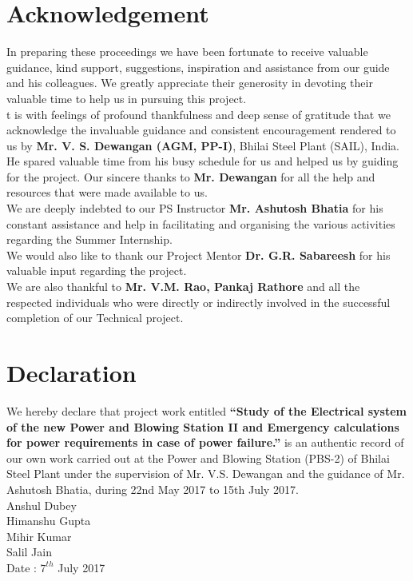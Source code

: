 \documentclass[english,11pt]{report}
\begin{document}
\chapter*{\centering Acknowledgement}
In preparing these proceedings we have been fortunate to receive valuable guidance, kind support, suggestions, inspiration and assistance from our guide and his colleagues. We greatly appreciate their generosity in devoting their valuable time to help us in pursuing this project.\\[1em]
t is with feelings of profound thankfulness and deep sense of gratitude that we acknowledge the invaluable guidance and consistent encouragement rendered to us by \textbf{Mr. V. S. Dewangan (AGM, PP-I)}, Bhilai Steel Plant (SAIL), India. He spared valuable time from his busy schedule for us and helped us by guiding for the project. Our sincere thanks to \textbf{Mr. Dewangan} for all the help and resources that were made available to us.\\[1em]
We are deeply indebted to our PS Instructor\textbf{ Mr. Ashutosh Bhatia} for his constant assistance and help in facilitating and organising the various activities regarding the Summer Internship.\\[1em]
We would also like to thank our Project Mentor \textbf{Dr. G.R. Sabareesh} for his valuable input regarding the project.\\[1em]
We are also thankful to\textbf{ Mr. V.M. Rao, Pankaj Rathore} and all the respected individuals who were directly or indirectly involved in the successful completion of our Technical project.


\chapter*{\centering Declaration}
We hereby declare that project work entitled \textbf{“Study of the Electrical system of the new Power and Blowing Station II and Emergency calculations for power requirements in case of power failure.”} is an authentic record of our own work carried out at the Power and Blowing Station (PBS-2) of Bhilai Steel Plant under the supervision of Mr. V.S. Dewangan and the guidance of Mr. Ashutosh Bhatia, during 22nd May 2017 to 15th July 2017. \\[2em]
Anshul Dubey\\[.5em]
Himanshu Gupta \\[.5em]
Mihir Kumar \\[.5em]
Salil Jain \\[3.5em]
Date : $7^{th}$ July 2017
\end{document}
